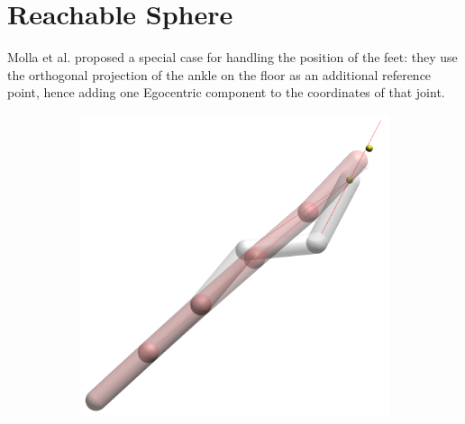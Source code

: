\section{Reachable Sphere}
\label{sec:reachableSphere}

Molla et al. \cite{molla2017egocentric} proposed a special case for handling the position of the feet: they use the orthogonal projection of the ankle on the floor as an additional reference point, hence adding one Egocentric component to the coordinates of that joint.

\begin{figure}[h]
    \centering
    \begin{subfigure}[b]{.35\textwidth}
        \includegraphics[width=\textwidth]{Figures/arm-full-nosphere.png}
    \end{subfigure}
    ~
    \begin{subfigure}[b]{.35\textwidth}

\end{subfigure}
\end{figure}
